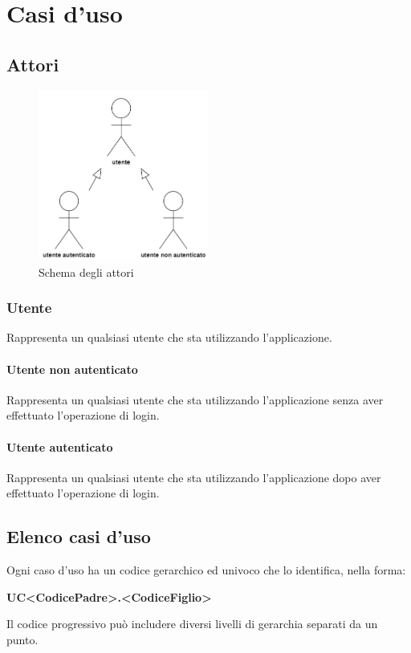 \section{Casi d'uso}
\subsection{Attori}
\begin{figure}[H]
    \centering
    \includegraphics[width=0.5\textwidth]{res/images/utenti.png}
    \caption{Schema degli attori}
\end{figure}
\subsubsection{Utente}
Rappresenta un qualsiasi utente che sta utilizzando l’applicazione.
\paragraph{Utente non autenticato}
Rappresenta un qualsiasi utente che sta utilizzando l’applicazione senza aver effettuato l’operazione di login.
\paragraph{Utente autenticato}
Rappresenta un qualsiasi utente che sta utilizzando l’applicazione dopo aver effettuato l’operazione di login.
\subsection{Elenco casi d'uso}

Ogni caso d’uso ha un codice gerarchico ed univoco che lo identifica, nella forma:
\newline
\newline
\centerline{\textbf{UC<CodicePadre>.<CodiceFiglio>}}
\newline
\newline
Il codice progressivo può includere diversi livelli di gerarchia separati da un punto.\\

